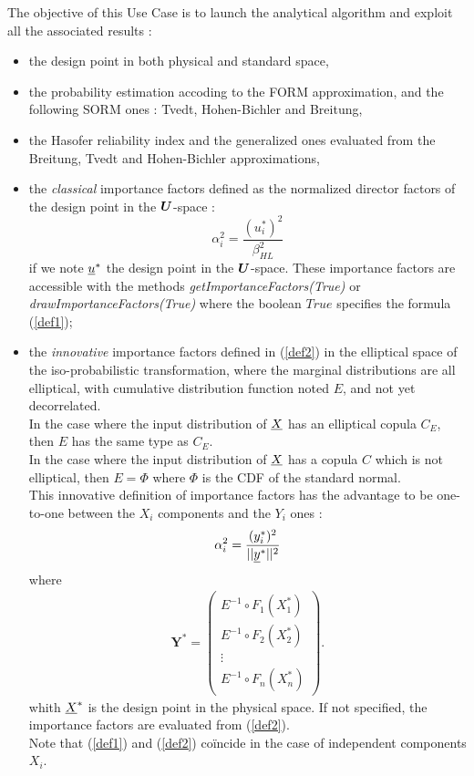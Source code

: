 The objective of this Use Case is to launch the analytical algorithm and exploit all the associated results :
\begin{itemize}
\item the design point in both physical and standard space,
\item the probability estimation accoding to the FORM approximation, and the following SORM ones : Tvedt, Hohen-Bichler and Breitung,
\item the Hasofer reliability index and the generalized ones evaluated from the Breitung, Tvedt and Hohen-Bichler approximations,
\item the \emph{classical} importance factors defined as the normalized director factors of the design point in the ${\boldsymbol{U}}$-space  :
  \begin{equation}\label{def1}
    \alpha_i^2 = \displaystyle \frac{(u_i^{*})^2}{\beta_{HL}^2}
  \end{equation}
  if we note ${\underline{u}}^*$ the design point in the ${\boldsymbol{U}}$-space. These importance factors are accessible with the methods \emph{getImportanceFactors(True)} or  \emph{drawImportanceFactors(True)} where the boolean $True$ specifies the formula (\ref{def1});
\item the \emph{innovative} importance factors defined in (\ref{def2}) in the elliptical space of  the iso-probabilistic transformation, where the marginal distributions are all elliptical, with  cumulative distribution function noted $E$, and not yet decorrelated.\\
In the case where the input distribution of ${\underline{X}}$ has an elliptical copula $C_E$, then $E$ has the same type as  $C_E$.\\
In the case where the input distribution of ${\underline{X}}$ has a copula $C$ which is not elliptical, then  $E=\Phi$ where $\Phi$ is the CDF of the standard normal.\\ 
This innovative definition of importance factors has the advantage to be one-to-one between the $X_i$ components and the $Y_i$ ones :
  \begin{equation}\label{def2}
    \alpha_i^2 = \displaystyle \frac{(y_i^{*})^2}{||{\underline{y}}^{*}||^2}
  \end{equation}
where 
  \begin{eqnarray}
    \boldsymbol{Y}^* =  \left(
      \begin{array}{c}
        E^{-1}\circ F_1(X_1^*) \\
        E^{-1}\circ F_2(X_2^*) \\
        \vdots \\
        E^{-1}\circ F_n(X_n^*)
      \end{array}
    \right).\label{varY10}
  \end{eqnarray}
whith ${\underline{X}}^*$ is the design point in the physical space. If not specified, the importance factors are evaluated from (\ref{def2}).\\
Note that (\ref{def1}) and  (\ref{def2}) coïncide in the case of independent components $X_i$.


\end{itemize}
